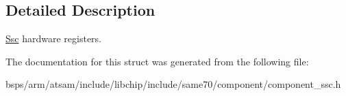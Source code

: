 \subsection{Detailed Description}
\mbox{\hyperlink{structSsc}{Ssc}} hardware registers. 

The documentation for this struct was generated from the following file\+:\begin{DoxyCompactItemize}
\item 
bsps/arm/atsam/include/libchip/include/same70/component/component\+\_\+ssc.\+h\end{DoxyCompactItemize}
